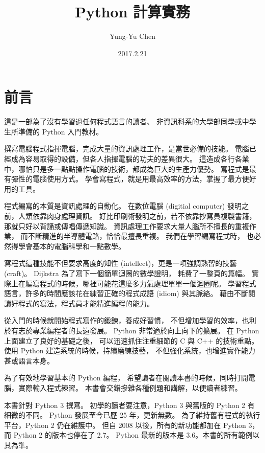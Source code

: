 \documentclass[a4paper,12pt]{book}
\theoremstyle{definition}
\begin{document}
\title{Python 計算實務}
\author{Yung-Yu Chen}
\date{2017.2.21}

\maketitle

\tableofcontents

\hspace{.5cm}

\frontmatter

\chapter{前言}

這是一部為了沒有學習過任何程式語言的讀者、
非資訊科系的大學部同學或中學生所準備的 Python 入門教材。

撰寫電腦程式指揮電腦，完成大量的資訊處理工作，是當世必備的技能。
電腦已經成為容易取得的設備，但各人指揮電腦的功夫的差異很大。
這造成各行各業中，哪怕只是多一點點操作電腦的技術，都成為巨大的生產力優勢。
寫程式是最有彈性的電腦使用方式。
學會寫程式，就是用最高效率的方法，掌握了最方便好用的工具。

程式編寫的本質是資訊處理的自動化。
在數位電腦 (digitial computer) 發明之前，人類依靠肉身處理資訊。
好比印刷術發明之前，若不依靠抄寫員複製書籍，那就只好以背誦或傳唱傳遞知識。
資訊處理工作要求大量人腦所不擅長的重複作業，
而不斷精進的半導體電路，恰恰最擅長重複。
我們在學習編寫程式時，
也必然得學會基本的電腦科學和一點數學。

寫程式這種技能不但要求高度的知性 (intellect)，更是一項強調熟習的技藝 (craft)。
Dijkstra 為了寫下一個簡單迴圈的數學證明，
耗費了一整頁的篇幅\cite{dahl_structured_1972}。
實際上在編寫程式的時候，哪裡可能花這麼多力氣處理單單一個迴圈呢。
學習程式語言，許多的時間應該花在練習正確的程式成語 (idiom) 與其脈絡。
藉由不斷閱讀好程式的寫法，程式員才能精進編程的能力。

從入門的時候就開始程式寫作的鍛鍊，養成好習慣，
不但增加學習的效率，也利於有志於專業編程者的長遠發展。
Python 非常適於向上向下的擴展。
在 Python 上面建立了良好的基礎之後，
可以迅速抓住注重細節的 C 與 C++ 的技術重點。
使用 Python 建造系統的時候，持續磨練技藝，
不但強化系統，也增進實作能力甚或語言本身。

為了有效地學習基本的 Python 編程，
希望讀者在閱讀本書的時候，同時打開電腦，實際輸入程式練習。
本書會交錯摻雜各種例題和講解，以便讀者練習。

本書針對 Python 3 撰寫。
初學的讀者要注意，Python 3 與舊版的 Python 2 有細微的不同。
Python 發展至今已歷 25 年，更新無數。
為了維持舊有程式的執行平台，Python 2 仍在維護中。
但自 2008 以後，所有的新功能都加在 Python 3，而 Python 2 的版本也停在了 2.7。
Python 最新的版本是 3.6。本書的所有範例以其為準。
\end{document}

